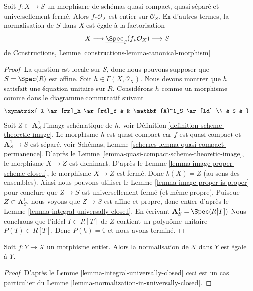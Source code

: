 \begin{lemma}
\label{lemma-normalization-in-universally-closed}
Soit $f : X \to S$ un morphisme de schémas quasi-compact, quasi-séparé
et universellement fermé. Alors
$f_*\mathcal{O}_X$ est entier sur $\mathcal{O}_S$. En d'autres termes, la normalisation
de $S$ dans $X$ est égale à la factorisation
$$
X \longrightarrow \underline{\Spec}_S(f_*\mathcal{O}_X)
\longrightarrow S
$$
de Constructions, Lemme \ref{constructions-lemma-canonical-morphism}.
\end{lemma}

\begin{proof}
La question est locale sur $S$, donc nous pouvons supposer que $S = \Spec(R)$
est affine. Soit $h \in \Gamma(X, \mathcal{O}_X)$. Nous devons montrer que $h$ satisfait
une équation unitaire sur $R$. Considérons $h$ comme un morphisme
comme dans le diagramme commutatif suivant
$$
\xymatrix{
X \ar[rr]_h \ar[rd]_f & & \mathbf{A}^1_S \ar[ld] \\
& S &
}
$$
Soit $Z \subset \mathbf{A}^1_S$ l'image schématique de $h$, voir
Définition \ref{definition-scheme-theoretic-image}. Le morphisme $h$
est quasi-compact car $f$ est quasi-compact
et $\mathbf{A}^1_S \to S$ est séparé, voir
Schémas, Lemme \ref{schemes-lemma-quasi-compact-permanence}. D'après le Lemme \ref{lemma-quasi-compact-scheme-theoretic-image},
le morphisme $X \to Z$ est dominant. D'après
le Lemme \ref{lemma-image-proper-scheme-closed}, le
morphisme $X \to Z$ est fermé. Donc $h(X) = Z$
(au sens des ensembles). Ainsi nous pouvons utiliser
le Lemme
\ref{lemma-image-proper-is-proper} pour conclure que $Z \to S$
est universellement fermé (et même propre).
Puisque $Z \subset \mathbf{A}^1_S$, nous voyons que $Z \to S$ est affine
et propre, donc entier d'après le Lemme \ref{lemma-integral-universally-closed}. En écrivant $\mathbf{A}^1_S = \Spec(R[T])$
Nous concluons que l'idéal $I \subset R[T]$ de
$Z$ contient un polynôme unitaire $P(T) \in R[T]$.
Donc $P(h) = 0$ et nous avons terminé.
\end{proof}

\begin{lemma}
\label{lemma-normalization-in-integral}
Soit $f : Y \to X$ un morphisme entier. Alors la normalisation
de $X$ dans $Y$ est égale à $Y$.
\end{lemma}

\begin{proof}
D'après le Lemme \ref{lemma-integral-universally-closed} ceci est un cas particulier
du Lemme \ref{lemma-normalization-in-universally-closed}.
\end{proof}

